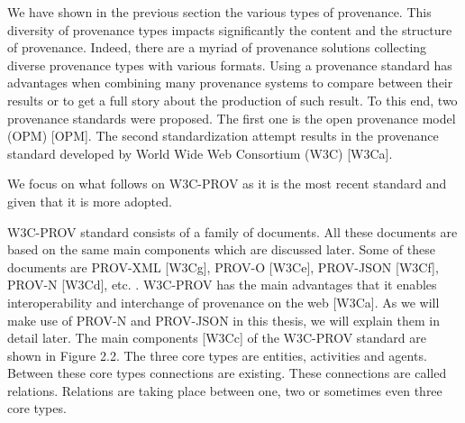 
We have shown in the previous section the various types of provenance.
This diversity of provenance types impacts significantly the content and the structure of provenance. 
Indeed, there are a myriad of provenance solutions collecting diverse provenance types with various formats.
Using a provenance standard has advantages when combining many provenance systems to compare between their results or to get a full story about the production of such result. To this end, two provenance standards were proposed. The first one is the open provenance model (OPM) [OPM]. The second standardization attempt results in the provenance standard developed by World Wide Web Consortium (W3C) [W3Ca].

We focus on what follows  on W3C-PROV as it is the most recent standard and given that it is more adopted. 


W3C-PROV standard consists of a family of documents. All these documents are based on the same main components which are discussed later. Some of these documents are PROV-XML [W3Cg], PROV-O [W3Ce], PROV-JSON [W3Cf], PROV-N [W3Cd], etc. . W3C-PROV has the main advantages that it enables interoperability and interchange of provenance on the web [W3Ca]. As we will make use of PROV-N and PROV-JSON in this thesis, we will explain them in detail later.
The main components [W3Cc] of the W3C-PROV standard are shown in Figure 2.2. The three core types are entities, activities and agents. Between these core types connections are existing. These connections are called relations. Relations are taking place between one, two or sometimes even three core types.
